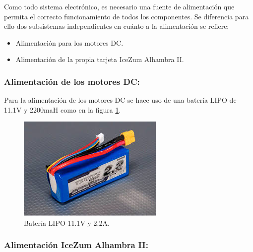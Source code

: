 Como todo sistema electrónico, es necesario una fuente de alimentación que permita el correcto funcionamiento de todos los componentes.  \newline
Se diferencia para ello dos subsistemas independientes en cuánto a la alimentación se refiere:
\begin{itemize}
	\item Alimentación para los motores DC.
	\item Alimentación de la propia tarjeta IceZum Alhambra II.
\end{itemize}

\subsubsection{Alimentación de los motores DC:}
Para la alimentación de los motores DC se hace uso de una batería LIPO de 11.1V y 2200maH como en la figura \ref{fig:lipo111}.

\begin{center}
	\begin{figure}[H]
		\center
		\includegraphics[scale=0.8]{imagenes/Balancing_Robot/LIPO111}
		\caption{Batería LIPO 11.1V y 2.2A. }
		\label{fig:lipo111}
	\end{figure}
\end{center}

\subsubsection{Alimentación IceZum Alhambra II:}

